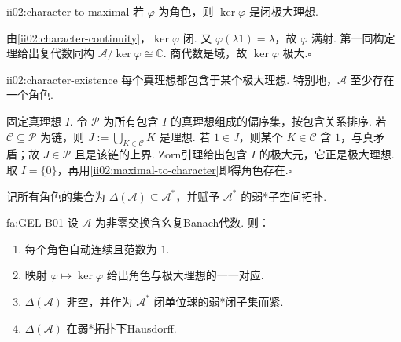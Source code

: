 \begin{FAProposition}[B][角色核是闭极大理想]{ii02:character-to-maximal}
若 \(\displaystyle\varphi\) 为角色，则 \(\displaystyle\ker\varphi\) 是闭极大理想.
\end{FAProposition}

\begin{FAProof}
由\autoref{ii02:character-continuity}，\(\displaystyle\ker\varphi\) 闭. 又 \(\displaystyle\varphi(\lambda1)=\lambda\)，故 \(\displaystyle\varphi\) 满射. 第一同构定理给出复代数同构
\(\displaystyle \mathcal A/\ker\varphi\cong\mathbb C.\)
商代数是域，故 \(\displaystyle\ker\varphi\) 极大.\hfill\(\square\)
\end{FAProof}

\begin{FALemma}[B][极大理想与角色的存在]{ii02:character-existence}
每个真理想都包含于某个极大理想. 特别地，\(\displaystyle\mathcal A\) 至少存在一个角色.
\end{FALemma}

\begin{FAProof}
固定真理想 \(\displaystyle I\). 令 \(\displaystyle\mathcal P\) 为所有包含 \(\displaystyle I\) 的真理想组成的偏序集，按包含关系排序. 若 \(\displaystyle\mathcal C\subseteq\mathcal P\) 为链，则 \(\displaystyle J:=\bigcup_{K\in\mathcal C}K\) 是理想. 若 \(\displaystyle1\in J\)，则某个 \(\displaystyle K\in\mathcal C\) 含 \(\displaystyle1\)，与真矛盾；故 \(\displaystyle J\in\mathcal P\) 且是该链的上界. Zorn引理给出包含 \(\displaystyle I\) 的极大元，它正是极大理想. 取 \(\displaystyle I=\{0\}\)，再用\autoref{ii02:maximal-to-character}即得角色存在.\hfill\(\square\)
\end{FAProof}

记所有角色的集合为 \(\displaystyle\Delta(\mathcal A)\subseteq\mathcal A^*\)，并赋予 \(\displaystyle\mathcal A^*\) 的弱*子空间拓扑.

\begin{FATheorem}[B][角色空间与极大理想空间的基本性质]{fa:GEL-B01}
设 \(\displaystyle\mathcal A\) 为非零交换含幺复Banach代数. 则：
\begin{enumerate}[label=(\roman*)]
\item 每个角色自动连续且范数为 \(\displaystyle1\).
\item 映射 \(\displaystyle\varphi\mapsto\ker\varphi\) 给出角色与极大理想的一一对应.
\item \(\displaystyle\Delta(\mathcal A)\) 非空，并作为 \(\displaystyle\mathcal A^*\) 闭单位球的弱*闭子集而紧.
\item \(\displaystyle\Delta(\mathcal A)\) 在弱*拓扑下Hausdorff.
\end{enumerate}
\end{FATheorem}

